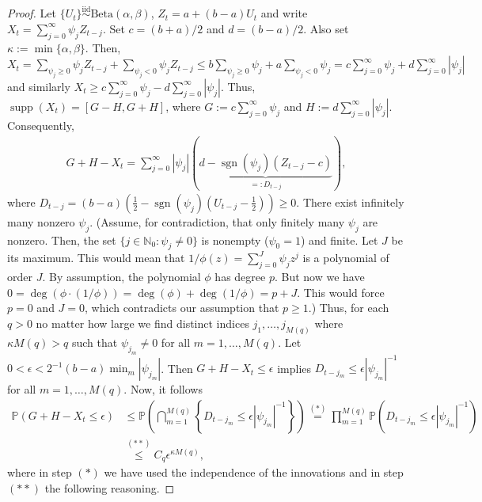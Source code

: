 \begin{proof}
    Let $\{U_t\}\stackrel{\text{iid}}{\sim}\text{Beta}(\alpha,\beta)$, $Z_t=a+(b-a)U_t$ and write $X_t=\sum_{j=0}^{\infty}\psi_jZ_{t-j}$. Set $c=(b+a)/2$ and $d=(b-a)/2$. Also set $\kappa:=\min\{\alpha,\beta\}$. Then, $X_t=\sum_{\psi_j\ge0}\psi_jZ_{t-j}+\sum_{\psi_j<0}\psi_jZ_{t-j}\le b\sum_{\psi_j\ge0}\psi_j+a\sum_{\psi_j<0}\psi_j=c\sum_{j=0}^{\infty}\psi_j+d\sum_{j=0}^{\infty}|\psi_j|$ and similarly $X_t\ge c\sum_{j=0}^{\infty}\psi_j-d\sum_{j=0}^{\infty}|\psi_j|$. Thus, $\operatorname{supp}(X_t)=[G-H,G+H]$, where $G:=c\sum_{j=0}^{\infty}\psi_j$ and $H:=d\sum_{j=0}^{\infty}|\psi_j|$. Consequently,
    \begin{align*}
        G+H-X_t=\sum_{j=0}^{\infty}|\psi_j|\left(\underbrace{d-\operatorname{sgn}(\psi_j)(Z_{t-j}-c)}_{=:D_{t-j}}\right),
    \end{align*}
    where $D_{t-j}=(b-a)(\frac{1}{2}-\operatorname{sgn}(\psi_j)(U_{t-j}-\frac{1}{2}))\ge0$. There exist infinitely many nonzero $\psi_j$. (Assume, for contradiction, that only finitely many $\psi_j$ are nonzero. Then, the set $\{j\in\mathbb{N}_0:\psi_j\ne0\}$ is nonempty ($\psi_0=1$) and finite. Let $J$ be its maximum. This would mean that $1/\phi(z)=\sum_{j=0}^{J}\psi_jz^{j}$ is a polynomial of order $J$. By assumption, the polynomial $\phi$ has degree $p$. But now we have $0=\deg(\phi\cdot(1/\phi))=\deg(\phi)+\deg(1/\phi)=p+J$. This would force $p=0$ and $J=0$, which contradicts our assumption that $p\ge1$.) Thus, for each $q>0$ no matter how large we find distinct indices $j_1,\dots,j_{M(q)}$ where $\kappa M(q)>q$ such that $\psi_{j_m}\ne0$ for all $m=1,\dots,M(q)$. Let $0<\epsilon<2^{-1}(b-a)\min_m|\psi_{j_m}|$. Then $G+H-X_t\le\epsilon$ implies $D_{t-j_m}\le\epsilon|\psi_{j_m}|^{-1}$ for all $m=1,\dots,M(q)$. Now, it follows
    \begin{align*}
        \mathbb{P}(G+H-X_t\le\epsilon)&\le\mathbb{P}\left(\bigcap_{m=1}^{M(q)}\left\{D_{t-j_m}\le\epsilon|\psi_{j_m}|^{-1}\right\}\right)\stackrel{(\ast)}{=}\prod_{m=1}^{M(q)}\mathbb{P}(D_{t-j_m}\le\epsilon|\psi_{j_m}|^{-1})\\&
        \stackrel{(\ast\ast)}{\le}C_q\epsilon^{\kappa M(q)},
    \end{align*}
    where in step $(\ast)$ we have used the independence of the innovations and in step $(\ast\ast)$ the following reasoning.


\end{proof}
